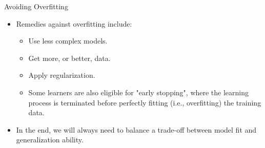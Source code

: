 \documentclass[11pt,compress,t,notes=noshow, xcolor=table]{beamer}
\begin{document}

% 
% 


\begin{vbframe}{Avoiding Overfitting}

\begin{itemize}
  \item Remedies against overfitting include:
  \begin{itemize}
    \item Use less complex models. 
    \item Get more, or better, data.
    \item Apply regularization.
    \item Some learners are also eligible for "early stopping", where the 
    learning process is terminated before perfectly fitting (i.e., overfitting) 
    the training data.
  \end{itemize}
  \item In the end, we will always need to balance a trade-off between model fit 
  and generalization ability.
\end{itemize}

\end{vbframe}


\end{document}
